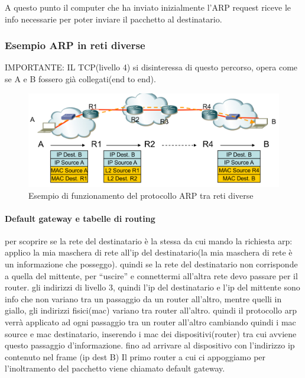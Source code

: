A questo punto il computer che ha inviato inizialmente l'ARP request riceve le info necessarie per poter inviare il pacchetto al destinatario. 
\newpage
\subsubsection{Esempio ARP in reti diverse}
IMPORTANTE: IL TCP(livello 4) si disinteressa di questo percorso, opera come se A e B fossero già collegati(end to end).

\begin{figure}[h!]
    \centering
    \includegraphics[width=1\textwidth]{images/esempioARPretidiverse.png}
    \caption{Esempio di funzionamento del protocollo ARP tra reti diverse}
    \label{fig:esempioARPretidiverse}
\end{figure}

\paragraph{Default gateway e tabelle di routing}

per scoprire se la rete del destinatario è la stessa da cui mando la richiesta arp: applico la mia maschera di rete all’ip del destinatario(la mia maschera di rete è un informazione che posseggo). quindi se la rete del destinatario non corrisponde a quella del mittente, per “uscire” e connettermi all’altra rete devo passare per il router. gli indirizzi di livello 3, quindi l’ip del destinatario e l’ip del mittente sono info che non variano tra un passaggio da un router all’altro, mentre quelli in giallo, gli indirizzi fisici(mac) variano tra router all’altro.
quindi il protocollo arp verrà applicato ad ogni passaggio tra un router all'altro cambiando quindi i mac source e mac destinatario, inserendo i mac dei dispositivi(router) tra cui avviene questo passaggio d’informazione. fino ad arrivare al dispositivo con l’indirizzo ip contenuto nel frame (ip dest B)
Il primo router a cui ci appoggiamo per l'inoltramento del pacchetto viene chiamato default gateway.

